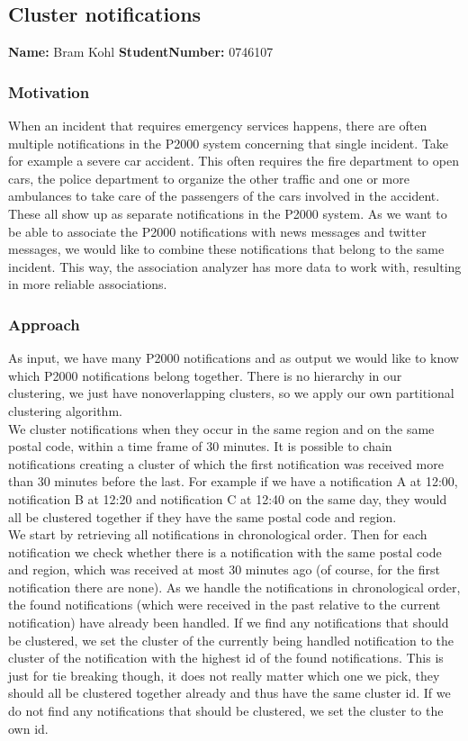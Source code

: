 \subsection{Cluster notifications}
\textbf{Name:} Bram Kohl \indent \textbf{StudentNumber:} 0746107

\subsubsection*{Motivation}
When an incident that requires emergency services happens, there are often multiple notifications in the P2000 system concerning that single incident. Take for example a severe car accident. This often requires the fire department to open cars, the police department to organize the other traffic and one or more ambulances to take care of the passengers of the cars involved in the accident. These all show up as separate notifications in the P2000 system. As we want to be able to associate the P2000 notifications with news messages and twitter messages, we would like to combine these notifications that belong to the same incident. This way, the association analyzer has more data to work with, resulting in more reliable associations.
\subsubsection*{Approach}
As input, we have many P2000 notifications and as output we would like to know which P2000 notifications belong together. There is no hierarchy in our clustering, we just have nonoverlapping clusters, so we apply our own partitional clustering algorithm.\\

We cluster notifications when they occur in the same region and on the same postal code, within a time frame of 30 minutes. It is possible to chain notifications creating a cluster of which the first notification was received more than 30 minutes before the last. For example if we have a notification A at 12:00, notification B at 12:20 and notification C at 12:40 on the same day, they would all be clustered together if they have the same postal code and region.\\

We start by retrieving all notifications in chronological order. Then for each notification we check whether there is a notification with the same postal code and region, which was received at most 30 minutes ago (of course, for the first notification there are none). As we handle the notifications in chronological order, the found notifications (which were received in the past relative to the current notification) have already been handled. If we find any notifications that should be clustered, we set the cluster of the currently being handled notification to the cluster of the notification with the highest id of the found notifications. This is just for tie breaking though, it does not really matter which one we pick, they should all be clustered together already and thus have the same cluster id. If we do not find any notifications that should be clustered, we set the cluster to the own id.\\

